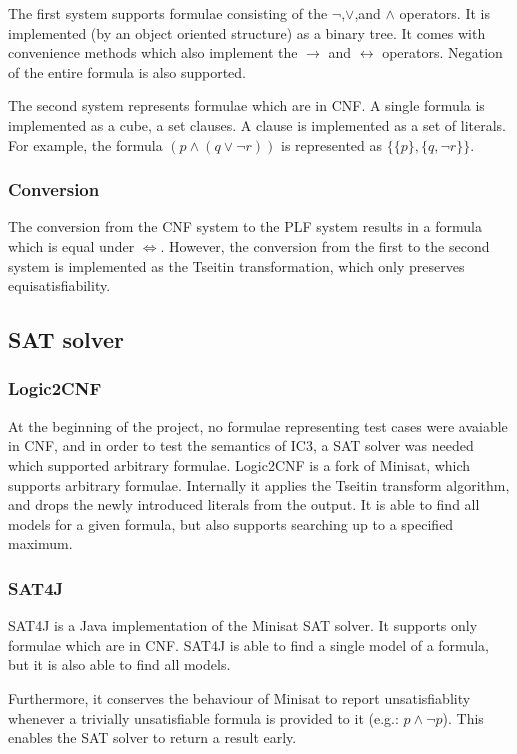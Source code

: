 \documentclass[a4paper]{article}
\begin{document}
The first system supports formulae consisting of the $\lnot$,$\lor$,and $\land$ operators. It is implemented (by an object oriented structure) as a binary tree. It comes with convenience methods which also implement the $\rightarrow$ and $\leftrightarrow$ operators. Negation of the entire formula is also supported.

The second system represents formulae which are in CNF. A single formula is implemented as a cube, a set clauses. A clause is implemented as a set of literals. For example, the formula $(p \land (q \lor \lnot r))$ is represented as $\{\{p\},\{q,\lnot r\}\}$.
\subsubsection{Conversion}
The conversion from the CNF system to the PLF system results in a formula which is equal under $\Leftrightarrow$. However, the conversion from the first to the second system is implemented as the Tseitin transformation, which only preserves equisatisfiability.

\subsection{SAT solver}
\subsubsection{Logic2CNF}
At the beginning of the project, no formulae representing test cases were avaiable in CNF, and in order to test the semantics of IC3, a SAT solver was needed which supported arbitrary formulae. Logic2CNF is a fork of Minisat, which supports arbitrary formulae. Internally it applies the Tseitin transform algorithm, and drops the newly introduced literals from the output. It is able to find all models for a given formula, but also supports searching up to a specified maximum.

\subsubsection{SAT4J}
SAT4J is a Java implementation of the Minisat SAT solver. It supports only formulae which are in CNF. SAT4J is able to find a single model of a formula, but it is also able to find all models.

Furthermore, it conserves the behaviour of Minisat to report unsatisfiablity whenever a trivially unsatisfiable formula is provided to it (e.g.: $p \land \lnot p$). This enables the SAT solver to return a result early.
\end{document}
